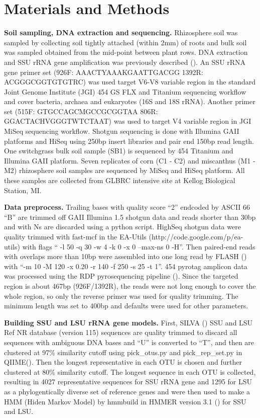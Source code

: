 \documentclass[12pt]{article}
\begin{document}
\section{Materials and Methods}
  {\bf Soil sampling, DNA extraction and sequencing. }
Rhizosphere soil was sampled by collecting soil tightly attached (within 2mm) of roots and bulk soil was sampled obtained from the mid-point between plant rows. DNA extraction and SSU rRNA gene amplification was previously described (\cite{ed2010}). An SSU rRNA gene primer set (926F: AAACTYAAAKGAATTGACGG 1392R: ACGGGCGGTGTGTRC) was used target V6-V8 variable region in the standard Joint Genome Institute (JGI) 454 GS FLX and Titanium sequencing workflow and cover bacteria, archaea and eukaryotes (16S and 18S rRNA). Another primer set (515F: GTGCCAGCMGCCGCGGTAA 806R: GGACTACHVGGGTWTCTAAT) was used to target V4 variable region in JGI MiSeq sequencing workflow. Shotgun sequencing is done with Illumina GAII platforms and HiSeq using 250bp insert libraries and pair end 150bp read length. One switchgrass bulk soil sample (SB1) is sequenced by 454 Titanium and Illumina GAII platform. Seven replicates of corn (C1 - C2) and miscanthus (M1 - M2) rhizosphere soil samples are sequenced by MiSeq and HiSeq platform. All these samples are collected from GLBRC intensive site at  Kellog Biological Station, MI.

  {\bf Data preprocess. }
Trailing bases with quality score ``2'' endcoded by ASCII 66 ``B'' are trimmed off GAII Illumina 1.5 shotgun data and reads shorter than 30bp and with Ns are discarded using a python script. HighSeq shotgun data were quality trimmed with fast-mcf in the EA-Utils (http://code.google.com/p/ea-utils) with flags `` -l 50 -q 30 -w 4 -k 0 -x 0 --max-ns 0 -H''. Then paired-end reads with overlaps more than 10bp were assembled into one long read by FLASH (\cite{flash2011}) with ``-m 10 -M 120 -x 0.20 -r 140 -f 250 -s 25 -t 1''. 454 pyrotag amplicon data was processed using the RDP pyrosequencing pipeline (\cite{rdp2009}). Since the targeted region is about 467bp (926F/1392R), the reads were not long enough to cover the whole region, so only the reverse primer was used for quality trimming. The minimum length was set to 400bp and defaults were used for other parameters.

  {\bf Building SSU and LSU rRNA gene models. }
First, SILVA (\cite{silva2013}) SSU and LSU Ref NR database (version 115) sequences are quality trimmed to discard all sequences with ambiguous DNA bases and ``U'' is converted to ``T'', and then are clustered at 97\% similarity cutoff using pick\_otus.py and pick\_rep\_set.py in QIIME(\cite{qiime}). Then the longest representative in each OTU is chosen and further clustered at 80\% similarity cutoff. The longest sequence in each OTU is collected, resulting in 4027 representative sequences for SSU rRNA gene and 1295 for LSU as a phylogentically diverse set of reference genes and were then used to make a HMM (Hiden Markov Model) by hmmbuild in HMMER version 3.1 (\cite{hmmer3}) for SSU and LSU.
\end{document}
